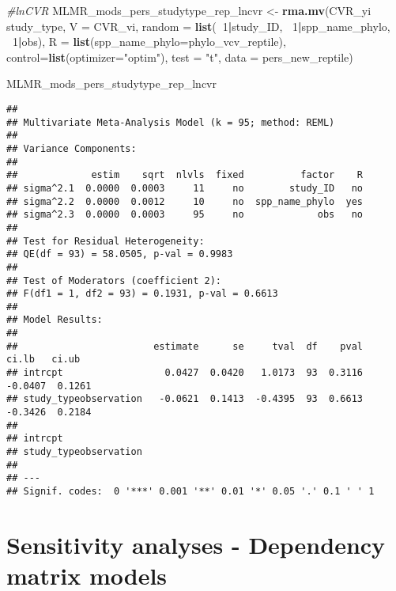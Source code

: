 \documentclass[]{article}
\newenvironment{Shaded}{\begin{snugshade}}{\end{snugshade}}
\newcommand{\KeywordTok}[1]{\textcolor[rgb]{0.13,0.29,0.53}{\textbf{#1}}}
\newcommand{\DataTypeTok}[1]{\textcolor[rgb]{0.13,0.29,0.53}{#1}}
\newcommand{\DecValTok}[1]{\textcolor[rgb]{0.00,0.00,0.81}{#1}}
\newcommand{\StringTok}[1]{\textcolor[rgb]{0.31,0.60,0.02}{#1}}
\newcommand{\CommentTok}[1]{\textcolor[rgb]{0.56,0.35,0.01}{\textit{#1}}}
\newcommand{\OperatorTok}[1]{\textcolor[rgb]{0.81,0.36,0.00}{\textbf{#1}}}
\newcommand{\NormalTok}[1]{#1}
\begin{document}
\begin{Shaded}
\begin{Highlighting}[]
      \CommentTok{#lnCVR}
\NormalTok{      MLMR_mods_pers_studytype_rep_lncvr <-}\StringTok{ }\KeywordTok{rma.mv}\NormalTok{(CVR_yi }\OperatorTok{~}\StringTok{ }\NormalTok{study_type, }\DataTypeTok{V =}\NormalTok{ CVR_vi, }
                                            \DataTypeTok{random =} \KeywordTok{list}\NormalTok{(}\OperatorTok{~}\DecValTok{1}\OperatorTok{|}\NormalTok{study_ID, }\OperatorTok{~}\DecValTok{1}\OperatorTok{|}\NormalTok{spp_name_phylo, }\OperatorTok{~}\DecValTok{1}\OperatorTok{|}\NormalTok{obs), }
                                            \DataTypeTok{R =} \KeywordTok{list}\NormalTok{(}\DataTypeTok{spp_name_phylo=}\NormalTok{phylo_vcv_reptile), }\DataTypeTok{control=}\KeywordTok{list}\NormalTok{(}\DataTypeTok{optimizer=}\StringTok{"optim"}\NormalTok{), }
                                            \DataTypeTok{test =} \StringTok{"t"}\NormalTok{, }\DataTypeTok{data =}\NormalTok{ pers_new_reptile)}
      
\NormalTok{      MLMR_mods_pers_studytype_rep_lncvr}
\end{Highlighting}
\end{Shaded}

\begin{verbatim}
## 
## Multivariate Meta-Analysis Model (k = 95; method: REML)
## 
## Variance Components:
## 
##             estim    sqrt  nlvls  fixed          factor    R 
## sigma^2.1  0.0000  0.0003     11     no        study_ID   no 
## sigma^2.2  0.0000  0.0012     10     no  spp_name_phylo  yes 
## sigma^2.3  0.0000  0.0003     95     no             obs   no 
## 
## Test for Residual Heterogeneity:
## QE(df = 93) = 58.0505, p-val = 0.9983
## 
## Test of Moderators (coefficient 2):
## F(df1 = 1, df2 = 93) = 0.1931, p-val = 0.6613
## 
## Model Results:
## 
##                        estimate      se     tval  df    pval    ci.lb   ci.ub 
## intrcpt                  0.0427  0.0420   1.0173  93  0.3116  -0.0407  0.1261 
## study_typeobservation   -0.0621  0.1413  -0.4395  93  0.6613  -0.3426  0.2184 
##  
## intrcpt 
## study_typeobservation 
## 
## ---
## Signif. codes:  0 '***' 0.001 '**' 0.01 '*' 0.05 '.' 0.1 ' ' 1
\end{verbatim}

\section{Sensitivity analyses - Dependency matrix
models}\label{sensitivity-analyses---dependency-matrix-models}
\end{document}
